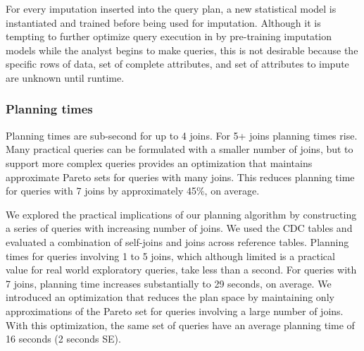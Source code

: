 For every imputation inserted into the query plan, a new statistical model is instantiated and trained before being used for imputation.
Although it is tempting to further optimize query execution in \ProjectName{} by pre-training imputation models while the analyst begins to make queries,
this is not desirable because the specific rows of data, set of complete attributes, and set of attributes to impute are unknown until runtime.

\subsubsection{Planning times}
\begin{table}
\centering

\caption{Planning times are sub-second for up to 4 joins. For 5+  joins planning times rise. Many practical queries
can be formulated with a smaller number of joins, but to support more complex queries \ProjectName{} provides an
optimization that maintains approximate Pareto sets for queries with many joins. This reduces planning time
for queries with 7 joins by approximately 45\%, on average.}
\label{table:planning-times}
\end{table}

We explored the practical implications of our planning algorithm by constructing a series of queries with increasing number of joins.
We used the CDC tables and evaluated a combination of self-joins and joins across reference tables. Planning times for queries
involving 1 to 5 joins, which although limited is a practical value for real world exploratory queries, take less than a second.
For queries with 7 joins, planning time increases substantially to 29 seconds, on average. We introduced an optimization that reduces
the plan space by maintaining only approximations of the Pareto set for queries involving a large number of joins.
With this optimization, the same set of queries have an average planning time of 16 seconds (2 seconds SE).



